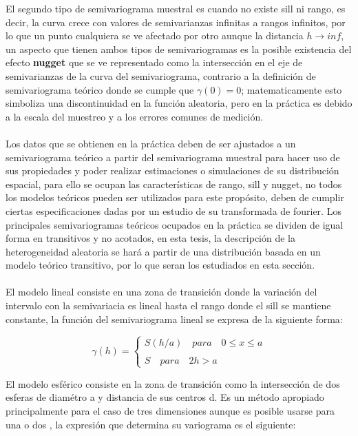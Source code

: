 El segundo tipo de semivariograma muestral es cuando no existe sill ni rango, es decir, la curva crece con valores de semivarianzas infinitas a rangos infinitos, por lo que un punto cualquiera se ve afectado por otro aunque la distancia $h{\to}inf$, un aspecto que tienen ambos tipos de semivariogramas es la posible existencia del efecto \textbf{nugget} que se ve representado como la intersección en el eje de semivarianzas de la curva del semivariograma, contrario a la definición de semivariograma teórico donde se cumple que $\gamma(0)=0$; matematicamente esto simboliza una discontinuidad en la función aleatoria, pero en la práctica es debido a la escala del muestreo y a los errores comunes de medición.
\\
\\
Los datos que se obtienen en la práctica deben de ser ajustados a un semivariograma teórico a partir del semivariograma muestral para hacer uso de sus propiedades y poder realizar estimaciones o simulaciones de su distribución espacial, para ello se ocupan las características de rango, sill y nugget, no todos los modelos teóricos pueden ser utilizados para este propósito, deben de cumplir ciertas especificaciones dadas por un estudio de su transformada de fourier. Los principales semivariogramas teóricos ocupados en la práctica se dividen de igual forma en transitivos y no acotados, en esta tesis, la descripción de la heterogeneidad aleatoria se hará a partir de una distribución basada en un modelo teórico transitivo, por lo que seran los estudiados en esta sección.
\\
\\
El modelo lineal consiste en una zona de transición donde la variación del intervalo con la semivariacia es lineal hasta el rango donde el sill se mantiene constante, la función del semivariograma lineal se expresa de la siguiente forma:

\begin{equation}
\gamma(h)= \left\{ \begin{array}{lcc}
             S(h/a) \quad  para  \quad 0 \leq x \leq a \\
             \\ S \quad para \quad 2h>a  
             \end{array}
   \right.
\end{equation}

El modelo esférico consiste en la zona de transición como la intersección de dos esferas de diamétro a y distancia de sus centros d. Es un método apropiado principalmente para el caso de tres dimensiones aunque es posible usarse para una o dos , la expresión que determina su variograma es el siguiente:

